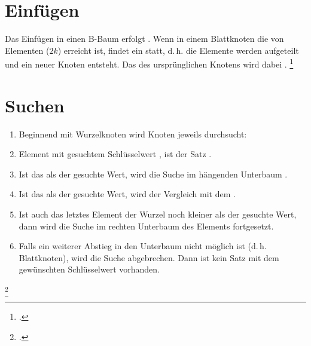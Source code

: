\documentclass{lehramt-informatik-haupt}
\begin{document}
\section{Einfügen}

Das Einfügen in einen B-Baum erfolgt .
Wenn in einem Blattknoten die  von Elementen
($2k$) erreicht ist, findet ein  statt, d.\,h. die
Elemente werden aufgeteilt und ein neuer Knoten entsteht. Das
 des ursprünglichen Knotens wird dabei .
\footcite[Seite 32 (PDF 26)]{aud:fs:5}

%

\section{Suchen}

\begin{enumerate}
\item Beginnend mit Wurzelknoten wird Knoten jeweils  durchsucht:

\item {} Element mit gesuchtem Schlüsselwert
, ist der Satz .

\item Ist das  als der gesuchte Wert, wird die
Suche im  hängenden Unterbaum .

\item Ist das  als der gesuchte Wert, wird der
Vergleich mit dem .

\item Ist auch das letztes Element der Wurzel noch kleiner als der
gesuchte Wert, dann wird die Suche im rechten Unterbaum des Elements
fortgesetzt.

\item Falls ein weiterer Abstieg in den Unterbaum nicht möglich ist
(d.\,h. Blattknoten), wird die Suche abgebrechen. Dann ist kein Satz mit
dem gewünschten Schlüsselwert vorhanden.
\end{enumerate}

\footcite[Seite 37 (PDF 31)]{aud:fs:5}

%
\end{document}
